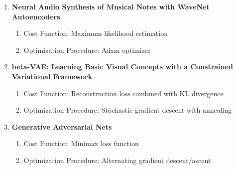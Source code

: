 \documentclass[10pt]{article} %
\begin{document}
\begin{enumerate}
\begin{enumerate}
    \item \textbf{Neural Audio Synthesis of Musical Notes with WaveNet Autoencoders}
    \begin{enumerate}
        \item Cost Function: Maximum likelihood estimation
        \item Optimization Procedure: Adam optimizer
    \end{enumerate}

    \item \textbf{beta-VAE: Learning Basic Visual Concepts with a Constrained Variational Framework}
    \begin{enumerate}
        \item Cost Function: Reconstruction loss combined with KL divergence
        \item Optimization Procedure: Stochastic gradient descent with annealing
    \end{enumerate}

    \item \textbf{Generative Adversarial Nets}
    \begin{enumerate}
        \item Cost Function: Minimax loss function
        \item Optimization Procedure: Alternating gradient descent/ascent
    \end{enumerate}
\end{enumerate}

\bigskip


\end{enumerate}
\end{document}
